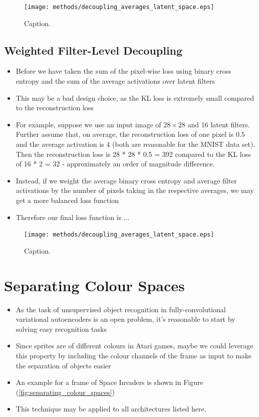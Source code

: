 \begin{figure}[H]
\centering
\captionsetup{justification=centering}
\texttt{[image: methods/decoupling\_averages\_latent\_space.eps]}
\caption{Caption.}
\label{fig:decoupling_averages_latent_space}
\end{figure}

%
%
\subsection{Weighted Filter-Level Decoupling}

\begin{itemize}
\item Before we have taken the sum of the pixel-wise loss using binary cross entropy and the sum of the average activations  over latent filters
\item This may be a bad design choice, as the KL loss is extremely small compared to the reconstruction loss
\item For example, suppose we use an input image of $28 \times 28$ and $16$ latent filters. Further assume that, on average, the reconstruction loss of one pixel is $0.5$ and the average activation is $4$ (both are reasonable for the MNIST data set). Then the reconstruction loss is 28 * 28 * 0.5 = 392 compared to the KL loss of 16 * 2 = 32 - approximately an order of magnitude difference.
\item Instead, if we weight the average binary cross entropy and average filter activations by the number of pixels taking in the respective averages, we may get a more balanced loss function 
\item Therefore our final loss function is ...
\end{itemize}

\begin{figure}[H]
\centering
\captionsetup{justification=centering}
\texttt{[image: methods/decoupling\_averages\_latent\_space.eps]}
\caption{Caption.}
\label{fig:decoupling_averages_latent_space}
\end{figure}


%
%
%
%
%
\section{Separating Colour Spaces}

\begin{itemize}
\item As the task of unsupervised object recognition in fully-convolutional variational autoencoders is an open problem, it's reasonable to start by solving easy recognition tasks
\item Since sprites are of different colours in Atari games, maybe we could leverage this property by including the colour channels of the frame as input to make the separation of objects easier
\item An example for a frame of Space Invaders is shown in Figure (\ref{fig:separating_colour_spaces})
\item This technique may be applied to all architectures listed here.
\end{itemize}


